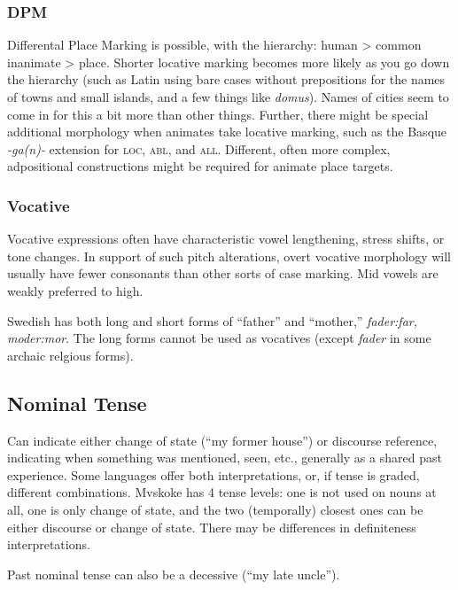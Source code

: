 \documentclass[11pt]{article}
\newcommand{\I}[1]{\textsc{#1}}   %
\begin{document}
\subsubsection{DPM} Differental Place Marking is possible, with the
hierarchy: human > common inanimate > place.  Shorter locative marking
becomes more likely as you go down the hierarchy (such as Latin using
bare cases without prepositions for the names of towns and small
islands, and a few things like \textit{domus}).  Names of cities seem
to come in for this a bit more than other things.  Further, there
might be special additional morphology when animates take locative
marking, such as the Basque \textit{-ga(n)-} extension for \I{loc},
\I{abl}, and \I{all}.  Different, often more complex, adpositional
constructions might be required for animate place targets.

\subsubsection{Vocative} Vocative expressions often have
characteristic vowel lengthening, stress shifts, or tone changes.  In
support of such pitch alterations, overt vocative morphology will
usually have fewer consonants than other sorts of case marking.  Mid
vowels are weakly preferred to high.

Swedish has both long and short forms of ``father'' and ``mother,''
\textit{fader:far, moder:mor}.  The long forms cannot be used as
vocatives (except \textit{fader} in some archaic relgious forms).

\subsection{Nominal Tense}
Can indicate either change of state (``my former house'') or discourse
reference, indicating when something was mentioned, seen, etc.,
generally as a shared past experience.  Some languages offer both
interpretations, or, if tense is graded, different combinations.
Mvskoke has 4 tense levels: one is not used on nouns at all, one is
only change of state, and the two (temporally) closest ones can be
either discourse or change of state.  There may be differences in
definiteness interpretations.

Past nominal tense can also be a decessive (``my late uncle'').
\end{document}
